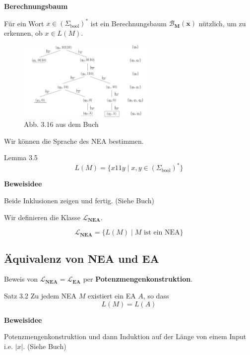 \documentclass[a4paper, 11pt]{article}
\newcommand\myTitle[1]{{\large \textbf {#1}}}
\begin{document}
        \myTitle{Berechnungsbaum}

        Für ein Wort $x \in (\Sigma_{\text{bool}})^*$ ist ein Berechnungsbaum $\mathbf{\mathcal{B}_M(x)}$ nützlich, um zu erkennen, ob  $x \in L(M)$.
    
        \begin{figure}[htp]
            \centering
            \includegraphics[width=0.6\textwidth]{Images/Berechnungsbaum.png}
            \caption{Abb. 3.16 aus dem Buch}
        \end{figure}
    
        Wir können die Sprache des NEA bestimmen.
        \begin{subbox}{Lemma 3.5}
            $$L(M) = \{x11y \mid x,y \in (\Sigma_{\text{bool}})^*\}$$
        \end{subbox}
        \textbf{Beweisidee}
    
        Beide Inklusionen zeigen und fertig. (Siehe Buch)
    
        Wir definieren die Klasse $\mathbf{\mathcal{L}_{\text{NEA}}}$.
        \begin{mainbox}{}
            $$\mathbf{\mathcal{L}_{\text{NEA}}} = \{L(M) \mid M \text{ ist ein NEA}\}$$
        \end{mainbox}
    
    
    
        \subsection{Äquivalenz von NEA und EA}
        Beweis von $\mathbf{\mathcal{L}_{\text{NEA}}} = \mathbf{\mathcal{L}_{\text{EA}}}$ per \textbf{Potenzmengenkonstruktion}.
        \begin{mainbox}{Satz 3.2}
            Zu jedem NEA $M$ existiert ein EA $A$, so dass
            $$L(M) = L(A)$$
        \end{mainbox}
        \textbf{Beweisidee}
    
        Potenzmengenkonstruktion und dann Induktion auf der Länge von einem Input i.e. $|x|$. (Siehe Buch)
    
\end{document}
